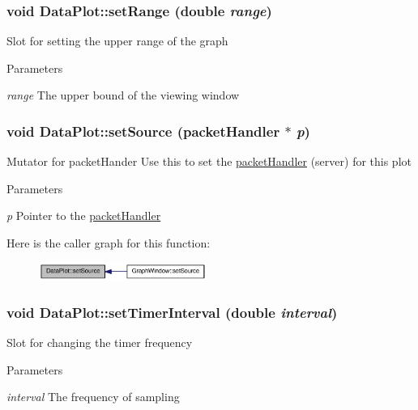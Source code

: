 \hypertarget{classDataPlot_a642185fdad89b1b075bc00670242fa0b}{
\subsubsection[{setRange}]{\setlength{\rightskip}{0pt plus 5cm}void DataPlot::setRange (double {\em range})}}
\label{classDataPlot_a642185fdad89b1b075bc00670242fa0b}
Slot for setting the upper range of the graph 
\begin{DoxyParams}{Parameters}
\item[{\em range}]The upper bound of the viewing window \end{DoxyParams}
\hypertarget{classDataPlot_aace03b9e68e11042c0fade588e2869a7}{
\subsubsection[{setSource}]{\setlength{\rightskip}{0pt plus 5cm}void DataPlot::setSource ({\bf packetHandler} $\ast$ {\em p})}}
\label{classDataPlot_aace03b9e68e11042c0fade588e2869a7}
Mutator for packetHander Use this to set the \hyperlink{classpacketHandler}{packetHandler} (server) for this plot 
\begin{DoxyParams}{Parameters}
\item[{\em p}]Pointer to the \hyperlink{classpacketHandler}{packetHandler} \end{DoxyParams}


Here is the caller graph for this function:\nopagebreak
\begin{figure}[H]
\begin{center}
\leavevmode
\includegraphics[width=155pt]{classDataPlot_aace03b9e68e11042c0fade588e2869a7_icgraph}
\end{center}
\end{figure}


\hypertarget{classDataPlot_a926020e0c49d78d3d5d282848368651e}{
\subsubsection[{setTimerInterval}]{\setlength{\rightskip}{0pt plus 5cm}void DataPlot::setTimerInterval (double {\em interval})}}
\label{classDataPlot_a926020e0c49d78d3d5d282848368651e}
Slot for changing the timer frequency 
\begin{DoxyParams}{Parameters}
\item[{\em interval}]The frequency of sampling \end{DoxyParams}



